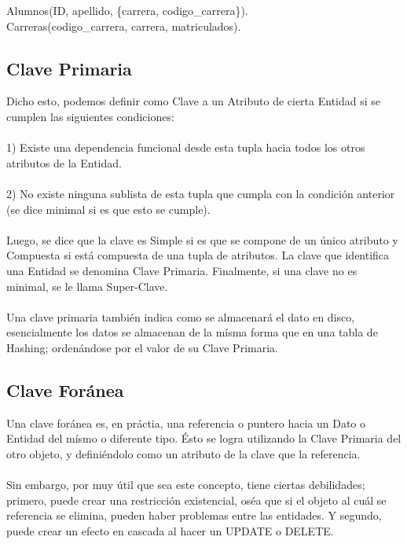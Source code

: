\documentclass[12pt]{article}
\begin{document}
\begin{center}
	Alumnos(ID, apellido, \{carrera, codigo\_carrera\}).
	\\
	Carreras(codigo\_carrera, carrera, matriculados).
\end{center}

\newpage

\subsection*{Clave Primaria}
Dicho esto, podemos definir como Clave a un Atributo de cierta Entidad si se cumplen
las siguientes condiciones:
\\\\
1) Existe una dependencia funcional desde esta tupla hacia todos los otros atributos
de la Entidad.
\\\\
2) No existe ninguna sublista de esta tupla que cumpla con la condición anterior
(se dice minimal si es que esto se cumple).
\\\\
Luego, se dice que la clave es Simple si es que se compone de un único atributo y
Compuesta si está compuesta de una tupla de atributos. La clave que identifica una Entidad
se denomina Clave Primaria. Finalmente, si una clave no es minimal, se le llama 
Super-Clave.
\\\\
Una clave primaria también indica como se almacenará el dato en disco, esencialmente
los datos se almacenan de la mísma forma que en una tabla de Hashing; ordenándose por el
valor de su Clave Primaria.

\subsection*{Clave Foránea}
Una clave foránea es, en práctia, una referencia o puntero hacia un Dato o Entidad del mísmo
o diferente tipo. Ésto se logra utilizando la Clave Primaria del otro objeto, y definiéndolo
como un atributo de la clave que la referencia.
\\\\
Sin embargo, por muy útil que sea este concepto, tiene ciertas debilidades; primero, puede
crear una restricción existencial, oséa que si el objeto al cuál se referencia se elimina, 
pueden haber problemas entre las entidades. Y segundo, puede crear un efecto en cascada al 
hacer un UPDATE o DELETE.

\newpage
\end{document}
